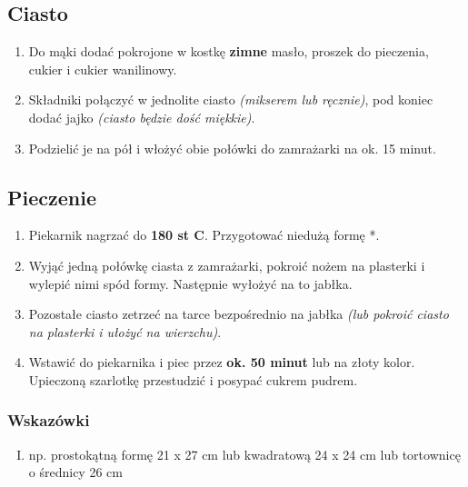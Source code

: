 \documentclass[11pt, a4paper, titlepage]{article}
\begin{document}
\subsection{Ciasto}
\begin{enumerate}
\item Do mąki dodać pokrojone w kostkę \textbf{zimne} masło, proszek do pieczenia, cukier i cukier wanilinowy.
\item Składniki połączyć w jednolite ciasto \textit{(mikserem lub ręcznie)}, pod koniec dodać jajko \textit{(ciasto będzie dość miękkie)}.
\item Podzielić je na pół i włożyć obie połówki do zamrażarki na ok. 15 minut.
\end{enumerate}
\subsection{Pieczenie}
\begin{enumerate}
\item Piekarnik nagrzać do \textbf{180 st C}. Przygotować niedużą formę *.
\item Wyjąć jedną połówkę ciasta z zamrażarki, pokroić nożem na plasterki i wylepić nimi spód formy. Następnie wyłożyć na to jabłka.
\item Pozostałe ciasto zetrzeć na tarce bezpośrednio na jabłka \textit{(lub pokroić ciasto na plasterki i ułożyć na wierzchu)}.
\item Wstawić do piekarnika i piec przez \textbf{ok. 50 minut} lub na złoty kolor. Upieczoną szarlotkę przestudzić i posypać cukrem pudrem.
\end{enumerate}

\subsubsection{Wskazówki}
\begin{enumerate}[I.]
\item {\fontsize{9pt}{\baselineskip}\selectfont np. prostokątną formę 21 x 27 cm lub kwadratową 24 x 24 cm lub tortownicę o średnicy 26 cm}\par
\end{enumerate}
\end{document}
